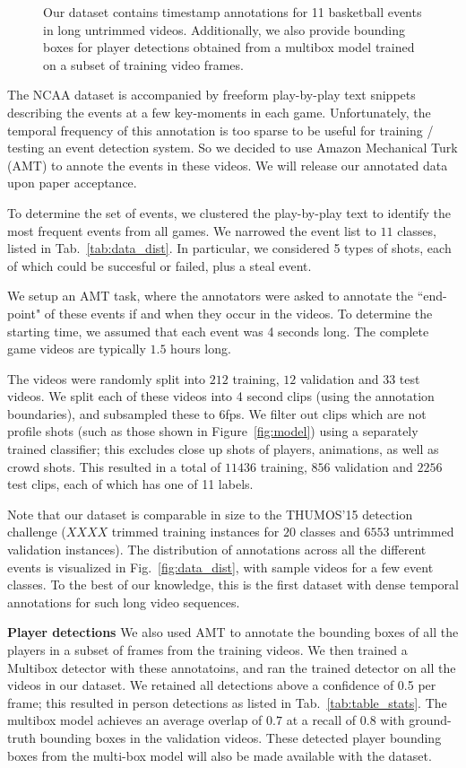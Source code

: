 \begin{figure}

  \caption{Our dataset contains timestamp annotations for 11 basketball events
    in long untrimmed videos. Additionally, we also provide bounding boxes for player
    detections obtained from a multibox model trained on a subset of training
  video frames.}
\end{figure}

The NCAA dataset is accompanied by freeform play-by-play text snippets
describing the events at a few key-moments in each game.  Unfortunately, the
temporal frequency of this annotation is too sparse to be useful for training /
testing an event detection system.  So we decided to use Amazon Mechanical Turk
(AMT) to annote the events in these videos. We will release our annotated data
upon paper acceptance.

To determine the set of events, we clustered the play-by-play text to identify
the most frequent events from all games. We narrowed the event list to $11$
classes, listed in Tab.~\ref{tab:data_dist}.  In particular, we considered
5 types of shots, each of which could be succesful or failed, plus a steal
event. 

We setup an AMT task, where the annotators were asked to annotate the
``end-point" of these events if and when they occur in the videos.  To
determine the starting time, we assumed that each event was 4 seconds long.
The complete game videos are typically $1.5$ hours long.

The videos were randomly split into $212$ training, $12$ validation and $33$
test videos.  We split each of these videos into 4 second clips (using the
annotation boundaries), and subsampled these to 6fps.  We filter out clips
which are not profile shots (such as those shown in Figure~\ref{fig:model})
using a separately trained classifier; this excludes close up shots of players,
animations, as well as crowd shots.  This resulted in a total of $11436$
training, $856$ validation and $2256$ test clips, each of which has one of 11
labels.

Note that our dataset is comparable in size to the THUMOS'15 detection
challenge ($XXXX$ trimmed training instances for $20$ classes and $6553$
untrimmed validation instances). The distribution of annotations across all the
different events is visualized in Fig.~\ref{fig:data_dist}, with sample videos
for a few event classes. To the best of our
knowledge, this is the first dataset with dense temporal annotations for
such long video sequences.

\noindent \textbf{Player detections}
We also used AMT to annotate the bounding boxes of all the players in a
subset  of frames from the training videos.
We then trained a Multibox detector \cite{Szegedy_arxiv14}
with these annotatoins, and ran the trained detector on all the videos in our dataset.
We retained all detections above a confidence of 0.5 per frame;
this resulted in person detections as listed in Tab.~\ref{tab:table_stats}.
The multibox model achieves an average overlap of $0.7$ at a recall of $0.8$
with ground-truth bounding boxes in the validation videos.
These detected player bounding boxes from the
multi-box model will also be made available with the dataset.
